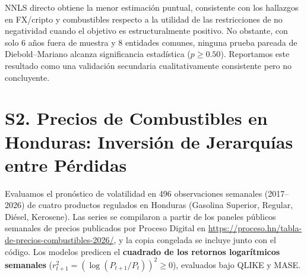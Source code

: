 \documentclass[aip,cha,reprint,amsmath,amssymb]{revtex4-2}
\begin{document}
NNLS directo obtiene la menor estimación puntual, consistente con los hallazgos en FX/cripto y combustibles respecto a la utilidad de las restricciones de no negatividad cuando el objetivo es estructuralmente positivo. No obstante, con solo 6 años fuera de muestra y 8 entidades comunes, ninguna prueba pareada de Diebold--Mariano alcanza significancia estadística ($p \ge 0.50$). Reportamos este resultado como una validación secundaria cualitativamente consistente pero no concluyente.

\section{S2. Precios de Combustibles en Honduras: Inversión de Jerarquías entre Pérdidas}
\label{sec:fuel}

Evaluamos el pronóstico de volatilidad en 496 observaciones semanales (2017--2026) de cuatro productos regulados en Honduras (Gasolina Superior, Regular, Diésel, Kerosene). Las series se compilaron a partir de los paneles públicos semanales de precios publicados por Proceso Digital en \url{https://proceso.hn/tabla-de-precios-combustibles-2026/}, y la copia congelada se incluye junto con el código. Los modelos predicen el \textbf{cuadrado de los retornos logarítmicos semanales} ($r_{t+1}^2 = (\log(P_{t+1}/P_t))^2 \ge 0$), evaluados bajo QLIKE y MASE.
\end{document}

